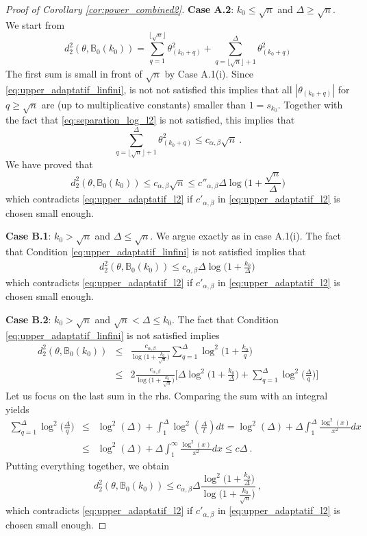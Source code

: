 \documentclass[twoside,11pt]{article}
\def\beqn{\begin{eqnarray*}}
\def\eeqn{\end{eqnarray*}}
\newcommand{\<}{\langle}
\renewcommand{\>}{\rangle}
\begin{document}
\begin{proof}[Proof of Corollary \ref{cor:power_combined2}]
 \bigskip 
 
 
 \noindent 
 {\bf Case A.2}: $k_0\leq \sqrt{n}$ and $\Delta\geq \sqrt{n}$. We start from 
 \[
  d^2_2(\theta,\mathbb{B}_0(k_0))= \sum_{q=1}^{\lfloor \sqrt{n}\rfloor}\theta^2_{(k_0+q)}+ \sum_{q=\lfloor \sqrt{n}\rfloor+1}^{\Delta }\theta^2_{(k_0+q)}
 \]
The first sum is small in front of $\sqrt{n}$ by Case A.1(i). 
 Since \eqref{eq:upper_adaptatif_linfini}, is not not satisfied this implies that all $|\theta_{(k_0+q)}|$ for $q\geq \sqrt{n}$ are (up to multiplicative constants) smaller than $1= s_{k_0}$. Together with the fact that
  \eqref{eq:separation_log_l2} is not satisfied, this implies that 
  \[
   \sum_{q=\lfloor \sqrt{n}\rfloor+1}^{\Delta }\theta^2_{(k_0+q)}\leq c_{\alpha,\beta} \sqrt{n}\ . 
  \]
We have proved that 
\[
   d^2_2(\theta,\mathbb{B}_0(k_0))\leq c_{\alpha,\beta} \sqrt{n}\leq c''_{\alpha,\beta} \Delta\log\big(1+ \frac{\sqrt{n}}{\Delta}\big)
\]
  which contradicts  \eqref{eq:upper_adaptatif_l2} if $c'_{\alpha,\beta}$ in \eqref{eq:upper_adaptatif_l2} is chosen small enough.
 
 \bigskip 
 
 
 \noindent 
 {\bf Case B.1}: $k_0> \sqrt{n}$ and $\Delta\leq \sqrt{n}$. We argue exactly as in case A.1(i). The fact that Condition \eqref{eq:upper_adaptatif_linfini} is not satisfied implies that 
 \beqn 
 d^2_2(\theta,\mathbb{B}_0(k_0))\leq c_{\alpha,\beta}\Delta\log\big(1+ \frac{k_0}{\Delta}\big)\,
 \eeqn 
 which contradicts  \eqref{eq:upper_adaptatif_l2} if $c'_{\alpha,\beta}$ in \eqref{eq:upper_adaptatif_l2} is chosen small enough.
 \bigskip 
 
\noindent  
 {\bf Case B.2}: $k_0 >\sqrt{n}$ and $ \sqrt{n}< \Delta\leq k_0$. 
 The fact that Condition \eqref{eq:upper_adaptatif_linfini} is not satisfied implies
 \beqn 
 d^2_2(\theta,\mathbb{B}_0(k_0))&\leq& \frac{c_{\alpha,\beta}}{\log\big(1+\frac{  k_0}{\sqrt{n}}\big)}\sum_{q=1 }^{\Delta} \log^2\big(1+ \frac{k_0}{q}\big)\\
 &\leq &2\frac{c_{\alpha,\beta}}{\log\big(1+\frac{  k_0}{\sqrt{n}}\big)} \Big[\Delta \log^2\big(1+ \frac{k_0}{\Delta}\big) + \sum_{q=1}^{\Delta}\log^2 \big(\frac{\Delta}{q}\big)\Big]
 \eeqn 
 Let us focus on the last sum in the rhs. Comparing the sum with an integral yields
 \beqn 
 \sum_{q=1}^{\Delta}\log^2 \big(\frac{\Delta}{q}\big)&\leq& \log^2(\Delta)+ \int_{1}^{\Delta}\log^2(\frac{\Delta}{t})dt = \log^2 (\Delta) + \Delta \int_{1}^{\Delta}\frac{\log^2(x)}{x^2}dx
 \\
 &\leq & \log^2(\Delta) +  \Delta \int_{1}^{\infty}\frac{\log^2(x)}{x^2}dx\leq c \Delta \ .
 \eeqn 
 Putting everything together, we obtain
 \[d^2_2(\theta,\mathbb{B}_0(k_0))\leq c_{\alpha,\beta}  \Delta \frac{ \log^2\big(1+ \frac{k_0}{\Delta}\big)}{\log\big(1+\frac{  k_0}{\sqrt{n}}\big)}\ , \]
 which contradicts  \eqref{eq:upper_adaptatif_l2} if $c'_{\alpha,\beta}$ in \eqref{eq:upper_adaptatif_l2} is chosen small enough.
 

\end{proof}
\end{document}

